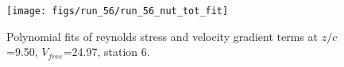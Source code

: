 \begin{figure}[H]
\centering
\texttt{[image: figs/run\_56/run\_56\_nut\_tot\_fit]}
\caption{Polynomial fits of reynolds stress and velocity gradient terms at $z/c$=9.50, $V_{free}$=24.97, station 6.}
\label{fig:run_56_nut_tot_fit}
\end{figure}


